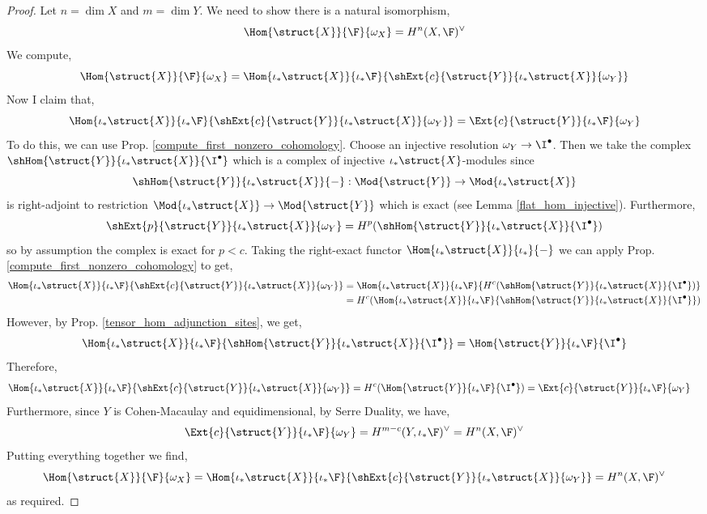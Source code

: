 \documentclass[12pt]{article}
\begin{document}
\begin{proof}
Let $n = \dim{X}$ and $m = \dim{Y}$.
We need to show there is a natural isomorphism,
\[ \Hom{\struct{X}}{\F}{\omega_X} = H^n(X, \F)^\vee \]
We compute,
\[ \Hom{\struct{X}}{\F}{\omega_X} = \Hom{\iota_* \struct{X}}{\iota_* \F}{\shExt{c}{\struct{Y}}{\iota_* \struct{X}}{\omega_Y}} \]
Now I claim that,
\[ \Hom{\iota_* \struct{X}}{\iota_* \F}{\shExt{c}{\struct{Y}}{\iota_* \struct{X}}{\omega_Y}} = \Ext{c}{\struct{Y}}{\iota_* \F}{\omega_Y} \]
To do this, we can use Prop. \ref{compute_first_nonzero_cohomology}.  Choose an injective resolution $\omega_Y \to \I^\bullet$. Then we take the complex $\shHom{\struct{Y}}{\iota_* \struct{X}}{\I^\bullet}$ which is a complex of injective $\iota_* \struct{X}$-modules since  \[ \shHom{\struct{Y}}{\iota_* \struct{X}}{-} : \Mod{\struct{Y}} \to \Mod{\iota_* \struct{X}} \] is right-adjoint to restriction $\Mod{\iota_* \struct{X}} \to \Mod{\struct{Y}}$ which is exact (see Lemma \ref{flat_hom_injective}). Furthermore,
\[ \shExt{p}{\struct{Y}}{\iota_* \struct{X}}{\omega_Y} = H^p(\shHom{\struct{Y}}{\iota_* \struct{X}}{\I^\bullet}) \]
so by assumption the complex is exact for $p < c$. 
Taking the right-exact functor $\Hom{\iota_* \struct{X}}{\iota_*}{-}$ we can apply Prop. \ref{compute_first_nonzero_cohomology} to get,
\begin{align*}
\Hom{\iota_* \struct{X}}{\iota_* \F}{\shExt{c}{\struct{Y}}{\iota_* \struct{X}}{\omega_Y}} & = \Hom{\iota_* \struct{X}}{\iota_* \F}{H^c(\shHom{\struct{Y}}{\iota_* \struct{X}}{\I^\bullet})}
\\
& = H^c(\Hom{\iota_* \struct{X}}{\iota_* \F}{\shHom{\struct{Y}}{\iota_* \struct{X}}{\I^\bullet}})
\end{align*}
However, by Prop. \ref{tensor_hom_adjunction_sites}, we get,
\[ \Hom{\iota_* \struct{X}}{\iota_* \F}{\shHom{\struct{Y}}{\iota_* \struct{X}}{\I^\bullet}}  = \Hom{\struct{Y}}{\iota_* \F}{\I^\bullet} \]
Therefore,
\begin{align*}
\Hom{\iota_* \struct{X}}{\iota_* \F}{\shExt{c}{\struct{Y}}{\iota_* \struct{X}}{\omega_Y}} & = H^c(\Hom{\struct{Y}}{\iota_* \F}{\I^\bullet}) = \Ext{c}{\struct{Y}}{\iota_* \F}{\omega_Y} 
\end{align*}
Furthermore, since $Y$ is Cohen-Macaulay and equidimensional, by Serre Duality, we have,
\[ \Ext{c}{\struct{Y}}{\iota_* \F}{\omega_Y} = H^{m-c}(Y, \iota_* \F)^\vee = H^{n}(X, \F)^\vee \]
Putting everything together we find,
\[ \Hom{\struct{X}}{\F}{\omega_X} = \Hom{\iota_* \struct{X}}{\iota_* \F}{\shExt{c}{\struct{Y}}{\iota_* \struct{X}}{\omega_Y}} = H^{n}(X, \F)^\vee \]
as required.
\end{proof}
\end{document}
